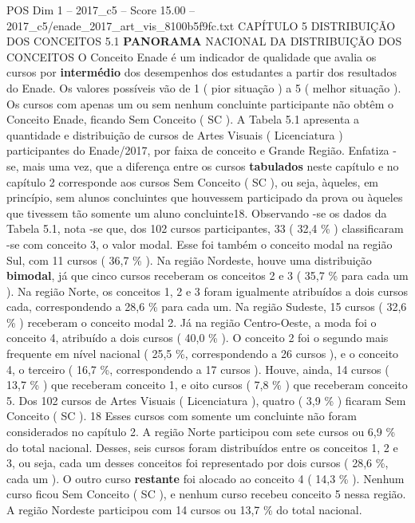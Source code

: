 \begin{textsample}{POS Dim 1 – 2017\_c5 – Score 15.00 – 2017\_c5/enade\_2017\_art\_vis\_8100b5f9fc.txt}  \label{ex:f1_pos_060}
CAPÍTULO 5 DISTRIBUIÇÃO DOS CONCEITOS 5.1 \textbf{PANORAMA} NACIONAL DA DISTRIBUIÇÃO DOS CONCEITOS O Conceito Enade é um indicador de qualidade que avalia os cursos por \textbf{intermédio} dos desempenhos dos estudantes a partir dos resultados do Enade.
Os valores possíveis vão de 1 ( pior situação ) a 5 ( melhor situação ).
Os cursos com apenas um ou sem nenhum concluinte participante não obtêm o Conceito Enade, ficando Sem Conceito ( SC ).
A Tabela 5.1 apresenta a quantidade e distribuição de cursos de Artes Visuais ( Licenciatura ) participantes do Enade/2017, por faixa de conceito e Grande Região.
Enfatiza -se, mais uma vez, que a diferença entre os cursos \textbf{tabulados} neste capítulo e no capítulo 2 corresponde aos cursos Sem Conceito ( SC ), ou seja, àqueles, em princípio, sem alunos concluintes que houvessem participado da prova ou àqueles que tivessem tão somente um aluno concluinte18.
Observando -se os dados da Tabela 5.1, nota -se que, dos 102 cursos participantes, 33 ( 32,4 \% ) classificaram -se com conceito 3, o valor modal.
Esse foi também o conceito modal na região Sul, com 11 cursos ( 36,7 \% ).
Na região Nordeste, houve uma distribuição \textbf{bimodal}, já que cinco cursos receberam os conceitos 2 e 3 ( 35,7 \% para cada um ).
Na região Norte, os conceitos 1, 2 e 3 foram igualmente atribuídos a dois cursos cada, correspondendo a 28,6 \% para cada um.
Na região Sudeste, 15 cursos ( 32,6 \% ) receberam o conceito modal 2.
Já na região Centro-Oeste, a moda foi o conceito 4, atribuído a dois cursos ( 40,0 \% ).
O conceito 2 foi o segundo mais frequente em nível nacional ( 25,5 \%, correspondendo a 26 cursos ), e o conceito 4, o terceiro ( 16,7 \%, correspondendo a 17 cursos ).
Houve, ainda, 14 cursos ( 13,7 \% ) que receberam conceito 1, e oito cursos ( 7,8 \% ) que receberam conceito 5.
Dos 102 cursos de Artes Visuais ( Licenciatura ), quatro ( 3,9 \% ) ficaram Sem Conceito ( SC ). 18 Esses cursos com somente um concluinte não foram considerados no capítulo 2.
A região Norte participou com sete cursos ou 6,9 \% do total nacional.
Desses, seis cursos foram distribuídos entre os conceitos 1, 2 e 3, ou seja, cada um desses conceitos foi representado por dois cursos ( 28,6 \%, cada um ).
O outro curso \textbf{restante} foi alocado ao conceito 4 ( 14,3 \% ).
Nenhum curso ficou Sem Conceito ( SC ), e nenhum curso recebeu conceito 5 nessa região.
A região Nordeste participou com 14 cursos ou 13,7 \% do total nacional.

\end{textsample}
